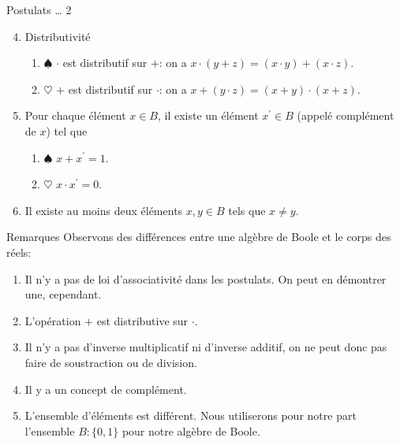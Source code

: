 \documentclass[presentation]{beamer}
\begin{document}
\begin{frame}[label={sec:orgdd25dd9}]{Postulats \ldots{} 2}
\begin{enumerate}
\setcounter{enumi}{3}
\item Distributivité

\begin{enumerate}
\item \(\spadesuit\) \(\cdot\) est distributif sur \(+\): on a \(x \cdot (y + z)= (x \cdot y) +
        (x \cdot z)\).

\item \(\heartsuit\) \(+\) est distributif sur \(\cdot\): on a \(x + (y \cdot z)= (x + y) \cdot
        (x + z)\).
\end{enumerate}

\item Pour chaque élément \(x \in B\), il existe un élément
\(x^{\prime} \in B\) (appelé complément de \(x\)) tel que

\begin{enumerate}
\item \(\spadesuit\) \(x + x^{\prime} = 1\).

\item \(\heartsuit\) \(x \cdot x^{\prime} = 0\).
\end{enumerate}

\item Il existe au moins deux éléments \(x, y \in B\) tels que \(x \neq y\).
\end{enumerate}
\end{frame}

\begin{frame}[label={sec:org40bc7ba}]{Remarques}
Observons des différences entre une algèbre de Boole et le corps des réels:

\begin{enumerate}
\item Il n'y a pas de loi d'associativité dans les postulats. On peut en démontrer une, cependant.

\item L'opération \(+\) est distributive sur \(\cdot\).

\item Il n'y a pas d'inverse multiplicatif ni d'inverse additif, on ne peut donc pas faire de soustraction ou de division.

\item Il y a un concept de complément.

\item L'ensemble d'éléments est différent. Nous utiliserons pour notre part l'ensemble \(B: \{0, 1 \}\) pour notre algèbre de Boole.
\end{enumerate}
\end{frame}
\end{document}
